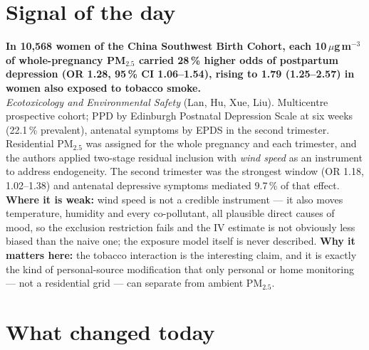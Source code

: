 \documentclass[10pt]{article}
\begin{document}
\vspace{6mm}

\section*{\sffamily\bfseries\color{Deep}Signal of the day}
\vspace{-1.5mm}{\color{Amber}\rule{\linewidth}{1.1pt}}\vspace{2.5mm}

\begin{keybox}
{\sffamily\bfseries\small\color{Deep}In 10,568 women of the China Southwest Birth Cohort, each 10\,$\mu$g\,m$^{-3}$ of whole-pregnancy PM$_{2.5}$ carried 28\,\% higher odds of postpartum depression (OR 1.28, 95\,\% CI 1.06--1.54), rising to 1.79 (1.25--2.57) in women also exposed to tobacco smoke.}\\[1.4mm]
\footnotesize
\textit{Ecotoxicology and Environmental Safety} (Lan, Hu, Xue, Liu). Multicentre prospective cohort; PPD by Edinburgh Postnatal Depression Scale at six weeks (22.1\,\% prevalent), antenatal symptoms by EPDS in the second trimester. Residential PM$_{2.5}$ was assigned for the whole pregnancy and each trimester, and the authors applied two-stage residual inclusion with \emph{wind speed} as an instrument to address endogeneity. The second trimester was the strongest window (OR 1.18, 1.02--1.38) and antenatal depressive symptoms mediated 9.7\,\% of that effect.
\textbf{Where it is weak:} wind speed is not a credible instrument --- it also moves temperature, humidity and every co-pollutant, all plausible direct causes of mood, so the exclusion restriction fails and the IV estimate is not obviously less biased than the naive one; the exposure model itself is never described.
\textbf{Why it matters here:} the tobacco interaction is the interesting claim, and it is exactly the kind of personal-source modification that only personal or home monitoring --- not a residential grid --- can separate from ambient PM$_{2.5}$.\par
\end{keybox}

\vspace{3mm}

\section*{\sffamily\bfseries\color{Deep}What changed today}
\vspace{-1.5mm}{\color{Amber}\rule{\linewidth}{1.1pt}}\vspace{2.5mm}
\end{document}
